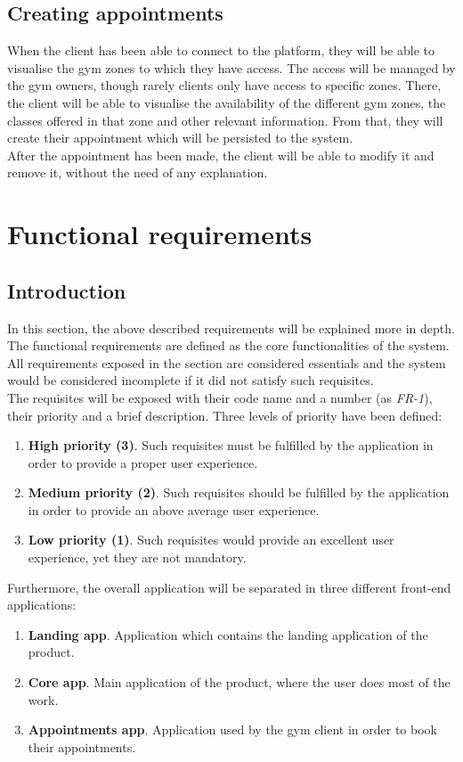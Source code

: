 \documentclass[a4paper, 12pt, oneside]{book}
\begin{document}
\subsection{Creating appointments}
When the client has been able to connect to the platform, they will be able to visualise the gym zones to which they have access. The access will be managed by the gym owners, though rarely clients only have access to specific zones. There, the client will be able to visualise the availability of the different gym zones, the classes offered in that zone and other relevant information. From that, they will create their appointment which will be persisted to the system.
\\[8pt]
After the appointment has been made, the client will be able to modify it and remove it, without the need of any explanation.
\section{Functional requirements}
\subsection{Introduction}
In this section, the above described requirements will be explained more in depth. The functional requirements are defined as the core functionalities of the system. All requirements exposed in the section are considered essentials and the system would be considered incomplete if it did not satisfy such requisites.
\\[8pt]
The requisites will be exposed with their code name and a number (as \emph{FR-1}), their priority and a brief description. Three levels of priority have been defined:
\begin{enumerate}[label = \arabic{*}.]
	\item \textbf{High priority (3)}. Such requisites must be fulfilled by the application in order to provide a proper user experience.
	\item \textbf{Medium priority (2)}. Such requisites should be fulfilled by the application in order to provide an above average user experience.
	\item \textbf{Low priority (1)}. Such requisites would provide an excellent user experience, yet they are not mandatory.
\end{enumerate}
Furthermore, the overall application will be separated in three different front-end applications:
\begin{enumerate}[label = \textbf{\arabic{*}.}]
	\item \textbf{Landing app}. Application which contains the landing application of the product.
	\item \textbf{Core app}. Main application of the product, where the user does most of the work.
	\item \textbf{Appointments app}. Application used by the gym client in order to book their appointments.
\end{enumerate}
\end{document}
